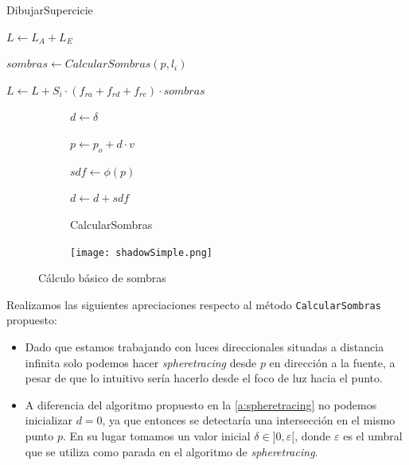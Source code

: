 \begin{algorithm}[H]
        \caption{DibujarSupercicie}
            $L \gets L_A + L_E$ 
             {

                $sombras \gets CalcularSombras(p, l_i)$

                $L \gets L + S_i\cdot (f_{ra} + f_{rd} + f_{re})\cdot sombras$
            }

    \end{algorithm}
\begin{figure}[ht!]
    \centering
    \begin{subfigure}[b]{0.50\textwidth}
   \begin{algorithm}[H]
            \caption{CalcularSombras}
                 $d \gets \delta$ 
                
                 {
                    $p \gets p_o + d \cdot v$
                    
                    $sdf \gets \phi(p)$
                    
            
                    $d \gets d + sdf$

                }

        \end{algorithm}
    \end{subfigure}%
    \hfill
    \begin{subfigure}[b]{0.48\textwidth}
        \texttt{[image: shadowSimple.png]}
    \end{subfigure}
    \caption{Cálculo básico de sombras}
    \label{fig:sombras1}
\end{figure}


Realizamos las siguientes apreciaciones respecto al método \texttt{CalcularSombras} propuesto:
\begin{itemize}
    \item Dado que estamos trabajando con luces direccionales situadas a distancia infinita solo podemos hacer \textit{spheretracing} desde $p$ en dirección a la fuente, a pesar de que lo intuitivo sería hacerlo desde el foco de luz hacia el punto.
    \item A diferencia del algoritmo propuesto en la \autoref{a:spheretracing} no podemos inicializar $d=0$, ya que entonces se detectaría una intersección en el mismo punto $p$. En su lugar tomamos un valor inicial  $\delta \in ]0, \varepsilon[$, donde $\varepsilon$ es el umbral que se utiliza como parada en el algoritmo de \textit{spheretracing}.
\end{itemize}

